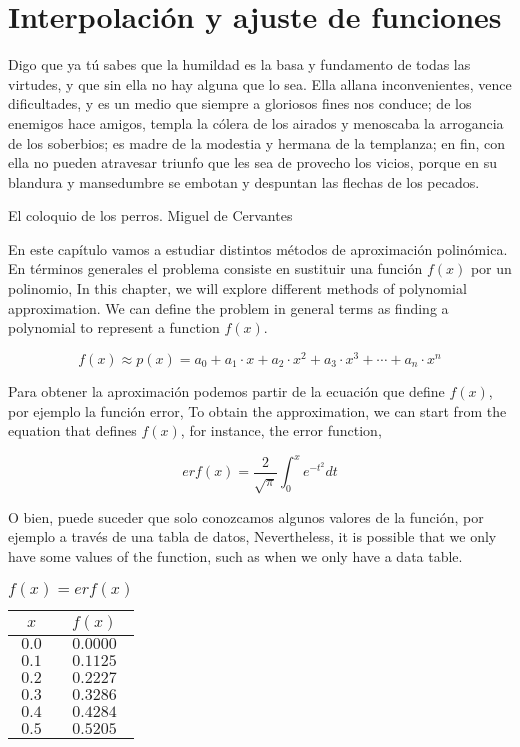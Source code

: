 \chapter{Interpolación y ajuste de funciones}\label{interpolacion}

\epigraph{Digo que ya tú sabes que la humildad es la basa y fundamento de todas las virtudes, y que sin ella no hay alguna que lo sea. Ella allana inconvenientes, vence dificultades, y es un medio que siempre a gloriosos fines nos conduce; de los enemigos hace amigos, templa la cólera de los airados y menoscaba la arrogancia de los soberbios; es madre de la modestia y hermana de la templanza; en fin, con ella no pueden atravesar triunfo que les sea de provecho los vicios, porque en su blandura y mansedumbre se embotan y despuntan las flechas de los pecados.}{El coloquio de los perros. Miguel de Cervantes}


\begin{paracol}{2}
En este capítulo vamos a estudiar distintos métodos de aproximación polinómica. En términos generales el problema consiste en sustituir una función $f(x)$ por un polinomio,
\switchcolumn
In this chapter, we will explore different methods of polynomial approximation. We can define the problem in general terms as finding a polynomial to represent a function $f(x)$. 
\end{paracol}
\begin{equation*}
f(x)\approx p(x)=a_0+a_1\cdot x+a_2\cdot x^2+a_3\cdot x^3+\cdots +a_n \cdot x^n
\end{equation*}
\begin{paracol}{2}
Para obtener la aproximación podemos partir de la ecuación que define $f(x)$,  por ejemplo la función error,
\switchcolumn
To obtain the approximation, we can start from the equation that defines $f(x)$, for instance, the error function,
\end{paracol}
\begin{equation*}
erf(x)=\frac{2}{\sqrt{\pi}}\int_0^x e^{-t^2}dt
\end{equation*}
\begin{paracol}{2}
O bien, puede suceder que solo conozcamos algunos valores de la función, por ejemplo a través de una tabla de datos,
\switchcolumn
Nevertheless, it is possible that we only have some values of the function, such as when we only have a data table. 
\end{paracol}
\begin{table}[h]
\caption{$f(x)=erf(x)$}
\centering
\begin{tabular}{c|c}
$x$&$f(x)$\\ 
\hline
$0.0$& $0.0000$\\
$0.1$&$0.1125$\\
$0.2$&$0.2227$\\
$0.3$&$0.3286$\\
$0.4$&$0.4284$\\
$0.5$&$0.5205$\\
\end{tabular}
\label{tpuntos2}
\end{table}

